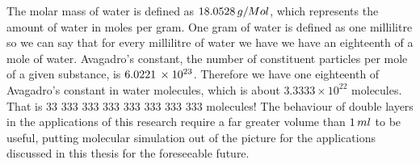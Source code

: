 The molar mass of water is defined as $18.0528\thinspace g/Mol$, which represents the amount of water in moles per gram. One gram of water is defined as one millilitre so we can say that for every millilitre of water we have we have an eighteenth of a mole of water. Avagadro's constant, the number of constituent particles per mole of a given substance, is $6.0221\thinspace \times 10^{23}$. Therefore we have one eighteenth of Avagadro's constant in water molecules, which is about $3.3333\times 10^{22}$ molecules. That is 33 333 333 333 333 333 333 333 molecules! The behaviour of double layers in the applications of this research require a far greater volume than $1\thinspace ml$ to be useful, putting molecular simulation out of the picture for the applications discussed in this thesis for the foreseeable future.
